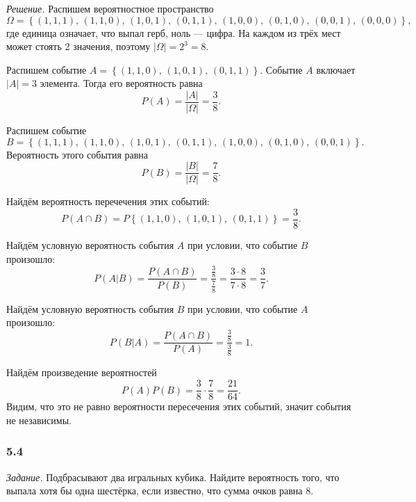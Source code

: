 \textit{Решение.} Распишем вероятностное пространство
$$ \Omega =
\left\{ \left( 1, 1, 1 \right), \,
\left( 1, 1, 0 \right), \, \left( 1, 0, 1 \right), \, \left( 0, 1, 1 \right), \,
\left( 1, 0, 0 \right), \, \left( 0, 1, 0 \right), \, \left( 0, 0, 1 \right), \,
\left( 0, 0, 0 \right) \right\},$$
где единица означает, что выпал герб, ноль --- цифра.
На каждом из трёх мест может стоять 2 значения, поэтому $ \left| \Omega \right| = 2^3 = 8$.

Распишем событие $A = \left\{ \left( 1, 1, 0 \right), \, \left( 1, 0, 1 \right), \, \left( 0, 1, 1 \right) \right\} $.
Событие $A$ включает $ \left| A \right| = 3$ элемента.
Тогда его вероятность равна
$$P \left( A \right) =
\frac{ \left| A \right| }{ \left| \Omega \right| } =
\frac{3}{8}.$$

Распишем событие
$$B = \left\{ \left( 1, 1, 1 \right), \,
\left( 1, 1, 0 \right), \, \left( 1, 0, 1 \right), \, \left( 0, 1, 1 \right), \,
\left( 1, 0, 0 \right), \, \left( 0, 1, 0 \right), \, \left( 0, 0, 1 \right) \right\}.$$
Вероятность этого события равна
$$P \left( B \right) =
\frac{ \left| B \right| }{ \left| \Omega \right| } = 
\frac{7}{8}.$$

Найдём вероятность перечечения этих событий:
$$P \left( A \cap B \right) =
P \left\{ \left( 1, 1, 0 \right), \, \left( 1, 0, 1 \right), \, \left( 0, 1, 1 \right) \right\} =
\frac{3}{8}.$$

Найдём условную вероятность события $A$ при условии, что событие $B$ произошло:
$$P \left( \left. A \right| B \right) =
\frac{P \left( A \cap B \right) }{P \left( B \right) } =
\frac{ \frac{3}{8} }{ \frac{7}{8} } =
\frac{3 \cdot 8}{7 \cdot 8} =
\frac{3}{7}.$$

Найдём условную вероятность события $B$ при условии, что событие $A$ произошло:
$$P \left( \left. B \right| A \right) =
\frac{P \left( A \cap B \right) }{P \left( A \right) } =
\frac{ \frac{3}{8} }{ \frac{3}{8} } =
1.$$

Найдём произведение вероятностей
$$P \left( A \right) P \left( B \right) =
\frac{3}{8} \cdot \frac{7}{8} =
\frac{21}{64}.$$
Видим, что это не равно вероятности пересечения этих событий, значит события не независимы.

\subsubsection*{5.4}

\textit{Задание.} Подбрасывают два игральных кубика.
Найдите вероятность того, что выпала хотя бы одна шестёрка, если известно, что сумма очков равна 8.

